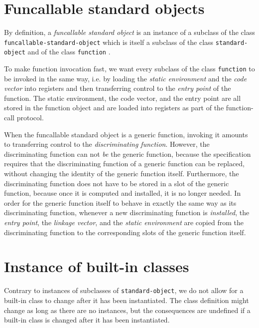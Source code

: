 \section{Funcallable standard objects}
\label{sec-data-representation-funcallable-standard-objects}

By definition, a \emph{funcallable standard object} is an instance of
a subclass of the class \texttt{funcallable-standard-object} which is
itself a subclass of the class \texttt{standard-object}
 and of the class
\texttt{function} .

To make function invocation fast, we want every subclass of the class
\texttt{function} to be invoked in the same way, i.e. by loading the
\emph{static environment} and the \emph{code vector} into registers
and then transferring control to the \emph{entry point} of the
function. The static environment, the code vector, and the entry point
are all stored in the function object and are loaded into registers as
part of the function-call protocol.

When the funcallable standard object is a generic function, invoking
it amounts to transferring control to the \emph{discriminating
  function}.  However, the discriminating function can not \emph{be}
the generic function, because the \clos{} specification requires that
the discriminating function of a generic function can be replaced,
without changing the identity of the generic function itself.
Furthermore, the discriminating function does not have to be stored in
a slot of the generic function, because once it is computed and
installed, it is no longer needed.  In order for the generic function
itself to behave in exactly the same way as its discriminating
function, whenever a new discriminating function is \emph{installed},
the \emph{entry point}, the \emph{linkage vector}, and the
\emph{static environment} are copied from the discriminating function
to the corresponding slots of the generic function itself.

\section{Instance of built-in classes}

Contrary to instances of subclasses of \texttt{standard-object}, we do
not allow for a built-in class to change after it has been
instantiated.  The class definition might change as long as there are
no instances, but the consequences are undefined if a built-in class
is changed after it has been instantiated.

